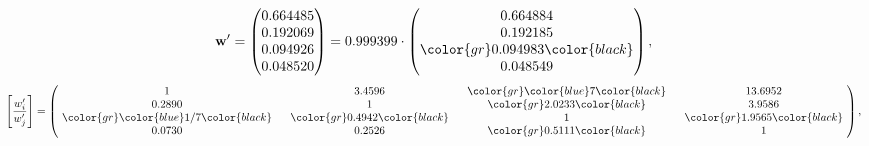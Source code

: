 \begin{example}
\begin{equation*}
\mathbf{w}^{\prime} =
\begin{pmatrix}
0.664485\\
0.192069\\
0.094926\\
0.048520
\end{pmatrix} =
0.999399\cdot
\begin{pmatrix}
0.664884\\
0.192185\\
\color{gr} 0.094983\color{black} \\
0.048549
\end{pmatrix},
\end{equation*}
\begin{equation*}
\left[ \frac{{w}^{\prime}_i}{{w}^{\prime}_j} \right] =
\begin{pmatrix}
$\,\,$ 1 $\,\,$ & $\,\,$3.4596$\,\,$ & $\,\,$\color{gr} \color{blue} 7\color{black} $\,\,$ & $\,\,$13.6952$\,\,$ \\
$\,\,$0.2890$\,\,$ & $\,\,$ 1 $\,\,$ & $\,\,$\color{gr} 2.0233\color{black} $\,\,$ & $\,\,$3.9586  $\,\,$ \\
$\,\,$\color{gr} \color{blue}  1/7\color{black} $\,\,$ & $\,\,$\color{gr} 0.4942\color{black} $\,\,$ & $\,\,$ 1 $\,\,$ & $\,\,$\color{gr} 1.9565\color{black}  $\,\,$ \\
$\,\,$0.0730$\,\,$ & $\,\,$0.2526$\,\,$ & $\,\,$\color{gr} 0.5111\color{black} $\,\,$ & $\,\,$ 1  $\,\,$ \\
\end{pmatrix},
\end{equation*}
\end{example}
\newpage
